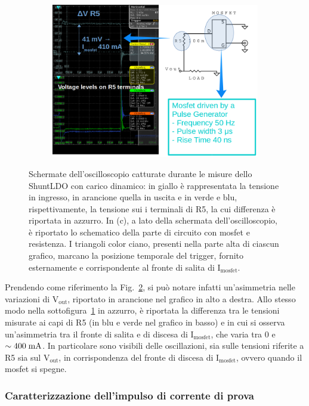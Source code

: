\begin{figure}
\begin{subfigure}{\textwidth}
  \centering
  \includegraphics[width=0.95\linewidth]{Immagini/zoomTransientTest3bis}
  \caption{ }
  \label{TransientTest:sfig3}
\end{subfigure}
\caption{Schermate dell'oscilloscopio catturate durante le misure dello ShuntLDO con carico dinamico: in giallo è rappresentata la tensione in ingresso, in arancione quella in uscita e in verde e blu, rispettivamente, la tensione sui i terminali di R5, la cui differenza è riportata in azzurro. In (c), a lato della schermata dell'oscilloscopio, è riportato lo schematico della parte di circuito con mosfet e resistenza. I triangoli color ciano, presenti nella parte alta di ciascun grafico, marcano la posizione temporale del trigger, fornito esternamente e corrispondente al fronte di salita di $\mathrm{I_{mosfet}}$.}
\label{TransientTest}
\end{figure}
Prendendo come riferimento la Fig.~\ref{TransientTest}, si può notare infatti un'asimmetria nelle variazioni di $\mathrm{V_{out}}$, riportato in arancione nel grafico in alto a destra.
Allo stesso modo nella sottofigura~\ref{TransientTest:sfig3} in azzurro, è riportata la differenza tra le tensioni misurate ai capi di R5 (in blu e verde nel grafico in basso) e in cui si osserva un'asimmetria tra il fronte di salita e di discesa di $\mathrm{I_{mosfet}}$, che varia tra 0 e $\sim 400\rm \; mA$. In particolare sono visibili delle oscillazioni, sia sulle tensioni riferite a R5 sia sul $\mathrm{V_{out}}$, in corrispondenza del fronte di discesa di $\mathrm{I_{mosfet}}$, ovvero quando il mosfet si spegne.

\subsubsection{Caratterizzazione dell'impulso di corrente di prova}
 
